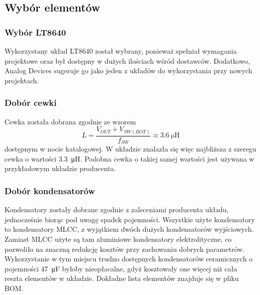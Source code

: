 \documentclass{article}
\begin{document}
\begin{figure}[H]
\begin{adjustbox}{width=1.1\textwidth,center}
{

            \label{fig:subfig2}
        }
    \end{adjustbox}
\end{figure}

\subsection{Wybór elementów}
\subsubsection{Wybór LT8640}
Wykorzystany układ LT8640 został wybrany, ponieważ spełniał wymagania projektowe oraz był dostępny w dużych ilościach wśród dostawców. Dodatkowo, Analog Devices sugeruje go jako jeden z układów do wykorzystania przy nowych projektach.

\subsubsection{Dobór cewki}
Cewka została dobrana zgodnie ze wzorem
\[
    L = \frac{V_{OUT} + V_{SW(BOT)}}{f_{SW}} \approx \SI{3.6}{\micro\henry}
\]
dostępnym w nocie katalogowej. W układzie znalazła się więc najbliższa z szeregu cewka o wartości \SI{3.3}{\micro\henry}. Podobna cewka o takiej samej wartości jest używana w przykładowym układzie producenta.

\subsubsection{Dobór kondensatorów}
Kondensatory zostały dobrane zgodnie z zaleceniami producenta układu, jednocześnie biorąc pod uwagę spadek pojemności. Wszystkie użyte kondensatory to kondensatory MLCC, z wyjątkiem dwóch dużych kondensatorów wyjściowych. Zamiast MLCC użyte są tam aluminiowe kondensatory elektrolityczne, co pozwoliło na znaczną redukcję kosztów przy zachowaniu dobrych parametrów. Wykorzystanie w tym miejscu trudno dostępnych kondensatorów ceramicznych o pojemności \SI{47}{\micro\farad} byłoby nieopłacalne, gdyż kosztowały one więcej niż cała reszta elementów w układzie. Dokładne lista elementów znajduje się w pliku BOM.
\end{document}
